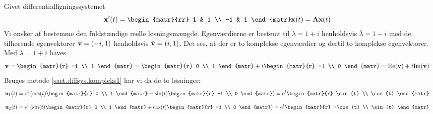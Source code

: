 \begin{example} \label{eks.diffsys,kompleks1}
Givet differentialligningssystemet
\begin{equation}
\mx'(t) = \begin{matr}{rr} 1 & 1 \\ -1 & 1 \end{matr} \mx(t) = \mA \mx(t) \label{lig.eks.diffsys.kompleks1}
\end{equation}
Vi ønsker at bestemme den fuldstændige reelle løsningsmængde. \bs
Egenværdierne er bestemt til $ \lambda = 1 + i $ henholdsvis $ \bar{\lambda} = 1 - i $ med de tilhørende egenvektorer $ \mathbf{v} = (-i,1) $ henholdsvis $ \bar{\mathbf{v}} = (i,1) $. Det ses, at der er to komplekse egenværdier og dertil to komplekse egenvektorer. Med $ \lambda = 1 + i $ haves
\begin{equation}
\mv = \begin{matr}{r} -i \\ 1 \end{matr}  = \begin{matr}{r} 0 \\ 1 \end{matr} + i \begin{matr}{r} -1 \\ 0 \end{matr} = \re(\mv) + i \im(\mv)
\end{equation}
Bruges metode \ref{saet.diffsys.kompleks1} har vi da de to løsninger:
\begin{equation}
\mathbf u_1(t) = \e^{t} \left(\cos(t) \begin{matr}{r} 0 \\ 1 \end{matr} - \sin(t) \begin{matr}{r} -1 \\ 0 \end{matr} \right) = \e^{t} \begin{matr}{r} \sin(t) \\ \cos(t) \end{matr}
\end{equation}
\begin{equation}
\mathbf u_2(t) = \e^{t} \left(\sin(t) \begin{matr}{r} 0 \\ 1 \end{matr} + \cos(t) \begin{matr}{r} -1 \\ 0 \end{matr} \right) = \e^{t} \begin{matr}{r} -\cos(t) \\ \sin(t) \end{matr}

\end{equation}
\end{example}
